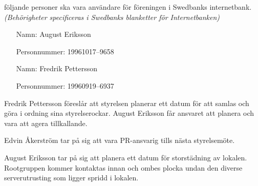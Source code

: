 \documentclass{protokoll}
\begin{document}
\begin{beslut}
    \att följande personer ska vara användare för föreningen i Swedbanks internetbank. \emph{(Behörigheter specificeras i Swedbanks blanketter för Internetbanken)}
    \begin{itemize}
        \item[Namn: ] August Eriksson
        \item[Personnummer: ] 19961017--9658

        \item[Namn: ] Fredrik Pettersson
        \item[Personnummer: ] 19960919--6937
    \end{itemize}
\end{beslut}

Fredrik Pettersson föreslår att styrelsen planerar ett datum för att samlas och göra i ordning sina styrelserockar. August Eriksson får ansvaret att planera och vara att agera tillkallande.

Edvin Åkerström tar på sig att vara PR-ansvarig tills nästa styrelsemöte.

August Eriksson tar på sig att planera ett datum för storstädning av lokalen. Rootgruppen kommer kontaktas innan och ombes plocka undan den diverse serverutrusting som ligger spridd i lokalen.
\end{document}
